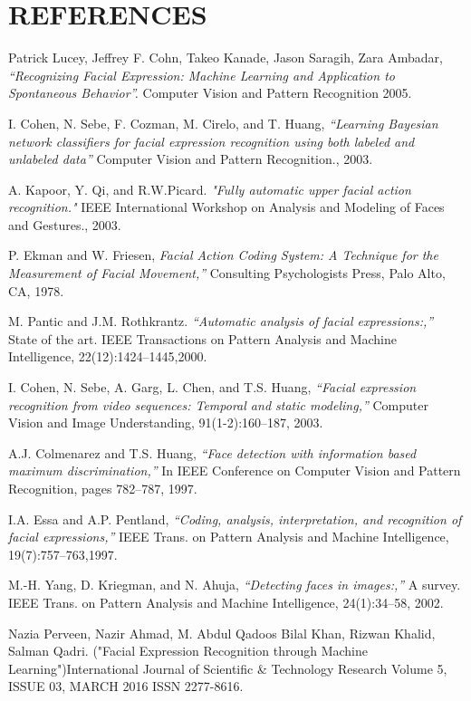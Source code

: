 \documentclass[a4paper,12pt,oneside]{article}
\begin{document}
\section{REFERENCES}
\begin{thebibliography}{9}


 Patrick Lucey, Jeffrey F. Cohn, Takeo Kanade, Jason Saragih, Zara Ambadar, \emph{“Recognizing Facial Expression: Machine Learning and Application to Spontaneous Behavior”. }Computer Vision and Pattern Recognition 2005.

 I. Cohen, N. Sebe, F. Cozman, M. Cirelo, and T. Huang,
\emph{“Learning Bayesian network classifiers for facial expression recognition using both labeled and unlabeled data” }
Computer Vision and Pattern Recognition., 2003.

A. Kapoor, Y. Qi, and R.W.Picard.
\emph{"Fully automatic upper facial action recognition."} 
IEEE International Workshop on Analysis and Modeling of Faces and
Gestures., 2003.

 P. Ekman and W. Friesen,\emph{ Facial Action Coding
System: A Technique for the Measurement of Facial
Movement,”} Consulting Psychologists Press, Palo Alto,
CA, 1978.

 M. Pantic and J.M. Rothkrantz. \emph{“Automatic analysis
of facial expressions:,”} State of the art. IEEE Transactions
on Pattern Analysis and Machine Intelligence,
22(12):1424–1445,2000.

 I. Cohen, N. Sebe, A. Garg, L. Chen, and T.S. Huang, \emph{“Facial expression recognition from video sequences:
Temporal and static modeling,”} Computer Vision and
Image Understanding, 91(1-2):160–187, 2003.

A.J. Colmenarez and T.S. Huang, \emph{“Face detection with
information based maximum discrimination,” }In IEEE
Conference on Computer Vision and Pattern
Recognition, pages 782–787, 1997.

 I.A. Essa and A.P. Pentland, \emph{“Coding, analysis,
interpretation, and recognition of facial expressions,”} IEEE Trans. on Pattern Analysis and Machine
Intelligence, 19(7):757–763,1997.

M.-H. Yang, D. Kriegman, and N. Ahuja,\emph{ “Detecting
faces in images:,”} A survey. IEEE Trans. on Pattern
Analysis and Machine Intelligence, 24(1):34–58, 2002.

Nazia Perveen, Nazir Ahmad, M. Abdul Qadoos
Bilal Khan, Rizwan Khalid, Salman Qadri. ("Facial
Expression Recognition through Machine Learning")International Journal of Scientific \& Technology
Research Volume 5, ISSUE 03, MARCH 2016 ISSN
2277-8616.


\end{thebibliography}
\end{document}

